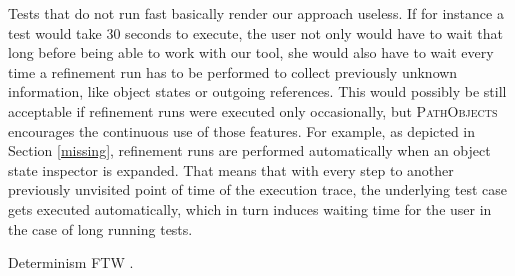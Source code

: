 Tests that do not run fast basically render our approach useless.
If for instance a test would take 30 seconds to execute, the user not only would have to wait that long before being able to work with our tool, she would also have to wait every time a refinement run has to be performed to collect previously unknown information, like object states or outgoing references.
This would possibly be still acceptable if refinement runs were executed only occasionally, but \textsc{PathObjects} encourages the continuous use of those features.
For example, as depicted in Section \ref{missing}, refinement runs are performed automatically when an object state inspector is expanded.
That means that with every step to another previously unvisited point of time of the execution trace, the underlying test case gets executed automatically, which in turn induces waiting time for the user in the case of long running tests.

Determinism FTW \cite{choi_deterministic_1998, felgentreff_comparison_2012}.